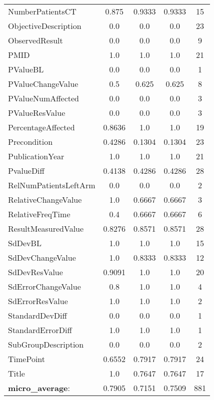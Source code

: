 \begin{longtable}{ l c c c c}
NumberPatientsCT & 0.875 & 0.9333 & 0.9333 & 15\\
ObjectiveDescription & 0.0 & 0.0 & 0.0 & 23\\
ObservedResult & 0.0 & 0.0 & 0.0 & 9\\
PMID & 1.0 & 1.0 & 1.0 & 21\\
PValueBL & 0.0 & 0.0 & 0.0 & 1\\
PValueChangeValue & 0.5 & 0.625 & 0.625 & 8\\
PValueNumAffected & 0.0 & 0.0 & 0.0 & 3\\
PValueResValue & 0.0 & 0.0 & 0.0 & 3\\
PercentageAffected & 0.8636 & 1.0 & 1.0 & 19\\
Precondition & 0.4286 & 0.1304 & 0.1304 & 23\\
PublicationYear & 1.0 & 1.0 & 1.0 & 21\\
PvalueDiff & 0.4138 & 0.4286 & 0.4286 & 28\\
RelNumPatientsLeftArm & 0.0 & 0.0 & 0.0 & 2\\
RelativeChangeValue & 1.0 & 0.6667 & 0.6667 & 3\\
RelativeFreqTime & 0.4 & 0.6667 & 0.6667 & 6\\
ResultMeasuredValue & 0.8276 & 0.8571 & 0.8571 & 28\\
SdDevBL & 1.0 & 1.0 & 1.0 & 15\\
SdDevChangeValue & 1.0 & 0.8333 & 0.8333 & 12\\
SdDevResValue & 0.9091 & 1.0 & 1.0 & 20\\
SdErrorChangeValue & 0.8 & 1.0 & 1.0 & 4\\
SdErrorResValue & 1.0 & 1.0 & 1.0 & 2\\
StandardDevDiff & 0.0 & 0.0 & 0.0 & 1\\
StandardErrorDiff & 1.0 & 1.0 & 1.0 & 1\\
SubGroupDescription & 0.0 & 0.0 & 0.0 & 2\\
TimePoint & 0.6552 & 0.7917 & 0.7917 & 24\\
Title & 1.0 & 0.7647 & 0.7647 & 17\\
\textbf{micro\_average}: & 0.7905 & 0.7151 & 0.7509 & 881 
\label{tab:Glaucoma_eventextr}
\end{longtable}
